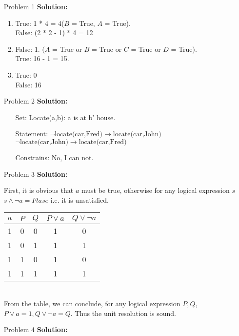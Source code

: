 \normalfont\documentclass[letterpaper,11pt]{article}
\begin{document}
\setlength{\parindent}{2ex}
\newcommand{\header}{
	\noindent {}
}
\bigskip
\header

\begin{enumerate}
\item[Problem 1]\textbf{Solution:}\par
	\begin{enumerate}
		\item \par
			True: 1 * 4 = 4($B$ = True, $A$ = True).\\
			False: (2 * 2 - 1) * 4 = 12
		\item \par
			False: 1. ($A$ = True or $B$ = True or $C$ = True or $D$ = True).\\
			True: 16 - 1 = 15. 			
		\item\par
			True:  0\\
			False: 16
	\end{enumerate}
\item[Problem 2]\textbf{Solution:}\par
	\begin{enumerate}
		\item[Set:]
			Locate(a,b): a is at b' house.			
		\item[Statement:]
			$\neg \text{locate(car,Fred)} \to \text{locate(car,John)}$\\
			$\neg \text{locate(car,John)} \to \text{locate(car,Fred)}$
		\item[Constrains:]
			No, I can not.
	\end{enumerate}
\item [Problem 3]\textbf{Solution:}\par
First, it is obvious that $a$ must be true, otherwise for any logical expression $s$ $s \land \neg a = Flase$ i.e. it is unsatisfied.\par
\begin{tabular}{c|c|c|c|c}
			\hline
			$a$ & $P$ & $Q$ & $P\lor a$ & $Q \lor \neg a$   \\
			\hline
			1 & 0 & 0 & 1 & 0 \\
			1 & 0 & 1 & 1 & 1 \\
			1 & 1 & 0 & 1 & 0 \\
			1 & 1 & 1 & 1 & 1 \\
		\end{tabular}\\
		From the table, we can conclude, for any logical expression $P,Q$, $P\lor a = 1, Q\lor \neg a = Q$. Thus the unit resolution is sound.
\item[Problem 4]\textbf{Solution:}\par


\end{enumerate}
\end{document}
